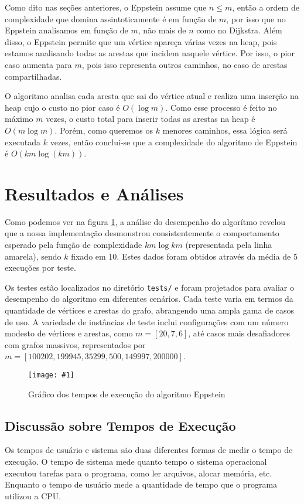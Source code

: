 \documentclass[12pt]{article}
\def\widthmod{}
\newcommand*\image[2]{\noindent \begin{figure}[htbp]
    \centering
    \texttt{[image: \#1]}
    \caption{#2}
    \label{fig: #1}
    \end{figure}
    }
\begin{document}
    Como dito nas seções anteriores, o Eppstein assume que $n \leq m$, então a ordem de complexidade que domina assintoticamente é em função de $m$, por isso que no Eppstein analisamos em função de $m$, não mais de $n$ como no Dijkstra. Além disso, o Eppstein permite que um vértice apareça várias vezes na heap, pois estamos analisando todas as arestas que incidem naquele vértice. Por isso, o pior caso aumenta para $m$, pois isso representa outros caminhos, no caso de arestas compartilhadas.
    
    O algoritmo analisa cada aresta que sai do vértice atual e realiza uma inserção na heap cujo o custo no pior caso é $O(\log m)$. Como esse processo é feito no máximo $m$ vezes, o custo total para inserir todas as arestas na heap é $O(m \log m)$. Porém, como queremos os $k$ menores caminhos, essa lógica será executada $k$ vezes, então conclui-se que a complexidade do algoritmo de Eppstein é $O(km \log (km))$.

    \newpage
    \section{Resultados e Análises}
    Como podemos ver na figura \ref{fig: runtimes}, a análise do desempenho do
    algorítmo revelou que a nossa implementação desmonstrou consistentemente o
    comportamento esperado pela função de complexidade $km \log km$ (representada
    pela linha amarela), sendo $k$ fixado em 10. Estes dados foram obtidos
    através da média de 5 execuções por teste.

    Os testes estão localizados no
    diretório \texttt{tests/} e foram projetados para avaliar o desempenho do
    algoritmo em diferentes cenários. Cada teste varia em termos da quantidade de
    vértices e arestas do grafo, abrangendo uma ampla gama de casos de uso. A
    variedade de instâncias de teste inclui configurações com um número modesto de
    vértices e arestas, como \( m = [20, 7, 6] \), até casos mais desafiadores com
    grafos massivos, representados por \( m = [100202, 199945, 35299, 500, 149997,
    200000] \).
 
    \def\widthmod{0.7}
    \image{runtimes}{Gráfico dos tempos de execução do algoritmo Eppstein}

    \subsection{Discussão sobre Tempos de Execução}
    Os tempos de usuário e sistema são duas diferentes formas de medir o tempo
    de execução. O tempo de sistema mede quanto tempo o sistema operacional
    executou tarefas para o programa, como ler arquivos, alocar memória, etc.
    Enquanto o tempo de usuário mede a quantidade de tempo que o programa
    utilizou a CPU. 
    
\end{document}
